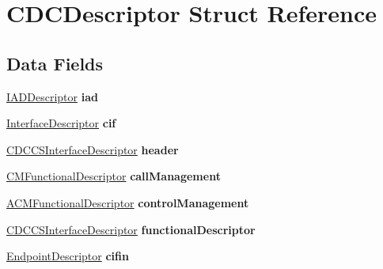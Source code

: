 \hypertarget{struct_c_d_c_descriptor}{\section{C\-D\-C\-Descriptor Struct Reference}
\label{struct_c_d_c_descriptor}
}
\subsection*{Data Fields}
\begin{DoxyCompactItemize}
\item 
\hypertarget{struct_c_d_c_descriptor_a934c0c9afb655c1127dc081488de0952}{\hyperlink{struct_i_a_d_descriptor}{I\-A\-D\-Descriptor} {\bfseries iad}}\label{struct_c_d_c_descriptor_a934c0c9afb655c1127dc081488de0952}

\item 
\hypertarget{struct_c_d_c_descriptor_a59ca319c155277d02e33d59292dc6d42}{\hyperlink{struct_interface_descriptor}{Interface\-Descriptor} {\bfseries cif}}\label{struct_c_d_c_descriptor_a59ca319c155277d02e33d59292dc6d42}

\item 
\hypertarget{struct_c_d_c_descriptor_a8cb2af4efd1b36ad3d11f1176a5628b3}{\hyperlink{struct_c_d_c_c_s_interface_descriptor}{C\-D\-C\-C\-S\-Interface\-Descriptor} {\bfseries header}}\label{struct_c_d_c_descriptor_a8cb2af4efd1b36ad3d11f1176a5628b3}

\item 
\hypertarget{struct_c_d_c_descriptor_a72f10e0be1c5b49a3bbd81111053bf3e}{\hyperlink{struct_c_m_functional_descriptor}{C\-M\-Functional\-Descriptor} {\bfseries call\-Management}}\label{struct_c_d_c_descriptor_a72f10e0be1c5b49a3bbd81111053bf3e}

\item 
\hypertarget{struct_c_d_c_descriptor_af1f3192e4a02d190879896f1a664e8b3}{\hyperlink{struct_a_c_m_functional_descriptor}{A\-C\-M\-Functional\-Descriptor} {\bfseries control\-Management}}\label{struct_c_d_c_descriptor_af1f3192e4a02d190879896f1a664e8b3}

\item 
\hypertarget{struct_c_d_c_descriptor_a94d8e9fea32078b996a9e272e1904c07}{\hyperlink{struct_c_d_c_c_s_interface_descriptor}{C\-D\-C\-C\-S\-Interface\-Descriptor} {\bfseries functional\-Descriptor}}\label{struct_c_d_c_descriptor_a94d8e9fea32078b996a9e272e1904c07}

\item 
\hypertarget{struct_c_d_c_descriptor_aceee3836101f5463719c5d4bfb8cecd7}{\hyperlink{struct_endpoint_descriptor}{Endpoint\-Descriptor} {\bfseries cifin}}\label{struct_c_d_c_descriptor_aceee3836101f5463719c5d4bfb8cecd7}


\end{DoxyCompactItemize}
